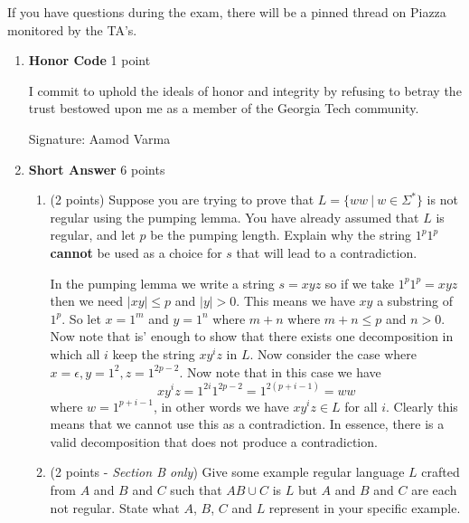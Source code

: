 \documentclass[11pt]{article}
\begin{document}
If you have questions during the exam, there will be a pinned thread on Piazza monitored by the TA's.
\begin{enumerate}

\item[0.] \textbf{Honor Code} 1 point

I commit to uphold the ideals of honor and integrity by refusing to betray the trust bestowed upon me as a member of the Georgia Tech community.

Signature: Aamod Varma  %

\item \textbf{Short Answer} 6 points

\begin{enumerate}
    
    
    \item (2 points) Suppose you are trying to prove that $L = \{ww\ |\ w \in \Sigma^*\}$ is not regular using the pumping lemma. You have already assumed that $L$ is regular, and let $p$ be the pumping length. Explain why the string $1^p1^p$ \textbf{cannot} be used as a choice for $s$ that will lead to a contradiction. 
    
      \begin{answer}
      In the pumping lemma we write a string $s = xyz$ so if we take $1^{p}1^{p} = xyz$ then we need $|xy| \le p$ and $|y| > 0$. This means we have $xy$ a substring of $1^{p}$. So let $x = 1^{m}$ and $y = 1^{n}$ where $m + n$ where $m + n \le p$ and $n > 0$. Now note that is' enough to show that there exists one decomposition in which all $i$ keep the string $xy^{i}z$ in $L$. Now consider the case where $x = \epsilon, y = 1^2, z= 1^{2p - 2}$. Now note that in this case we have $$xy^{i}z = 1^{2i}1^{2p - 2} = 1^{2(p + i - 1)}= w w$$ where $w = 1^{p + i - 1}$, in other words we have $xy^{i}z \in L$ for all $i$. Clearly this means that we cannot use this as a contradiction. In essence, there is a valid decomposition that does not produce a contradiction.
    \end{answer}
    
    \item (2 points - \textit{Section B only}) 
   Give some example regular language $L$ crafted from $A$ and $B$ and $C$ such that $AB\cup C$ is $L$ but $A$ and $B$ and $C$ are each not regular. State what $A$, $B$, $C$ and $L$ represent in your specific example. 
    
    \begin{answer}
    \end{answer}
    

\end{enumerate}
\end{enumerate}
\end{document}

